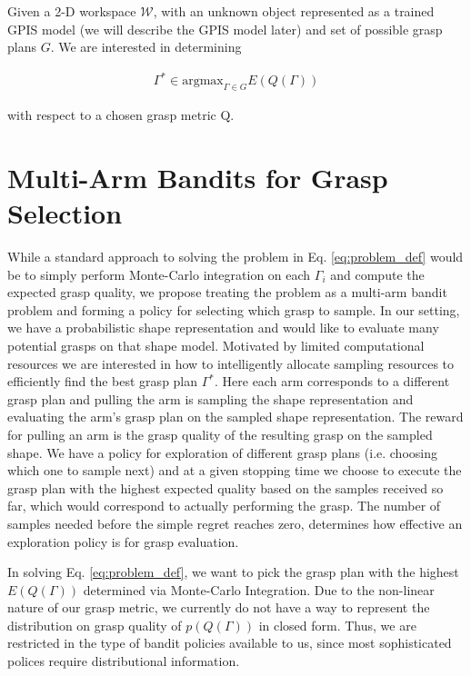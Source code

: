 \documentclass[letterpaper, 10 pt, conference]{ieeeconf}  %
\begin{document}
Given a 2-D workspace $\mathcal{W}$, with an unknown object represented as a trained GPIS model (we will describe the GPIS model later) and set of possible grasp plans $G$.
We are interested in determining 

\begin{align}\label{eq:problem_def}
\Gamma^* \in \mbox{argmax}_{\Gamma \in G} E(Q(\Gamma))
\end{align}

with respect to a chosen grasp metric Q. 


\section{Multi-Arm Bandits for Grasp Selection}
While a standard approach to solving the problem in Eq. \ref{eq:problem_def} would be to simply perform Monte-Carlo integration on each $\Gamma_i$ and compute the expected grasp quality, we propose treating the problem as a multi-arm bandit problem and forming a policy for selecting which grasp to sample. 
In our setting, we have a probabilistic shape representation and would like to evaluate many potential grasps on that shape model.
Motivated by limited computational resources we are interested in how to intelligently allocate sampling resources to efficiently find the best grasp plan $\Gamma^*$.
Here each arm corresponds to a different grasp plan and pulling the arm is sampling the shape representation and evaluating the arm's grasp plan on the sampled shape representation.
The reward for pulling an arm is the grasp quality of the resulting grasp on the sampled shape.
We have a policy for exploration of different grasp plans (i.e. choosing which one to sample next) and at a given stopping time we choose to execute the grasp plan with the highest expected quality based on the samples received so far, which would correspond to actually performing the grasp.  
The number of samples needed before the simple regret reaches zero, determines how effective an exploration policy is for grasp evaluation.

In solving Eq. \ref{eq:problem_def}, we want to pick the grasp plan with the highest $E(Q(\Gamma))$ determined via Monte-Carlo Integration.
Due to the non-linear nature of our grasp metric, we currently do not have a way to represent the distribution on grasp quality of $p(Q(\Gamma))$ in closed form.
Thus, we are restricted in the type of bandit policies available to us, since most sophisticated polices require distributional information. 
\end{document}
